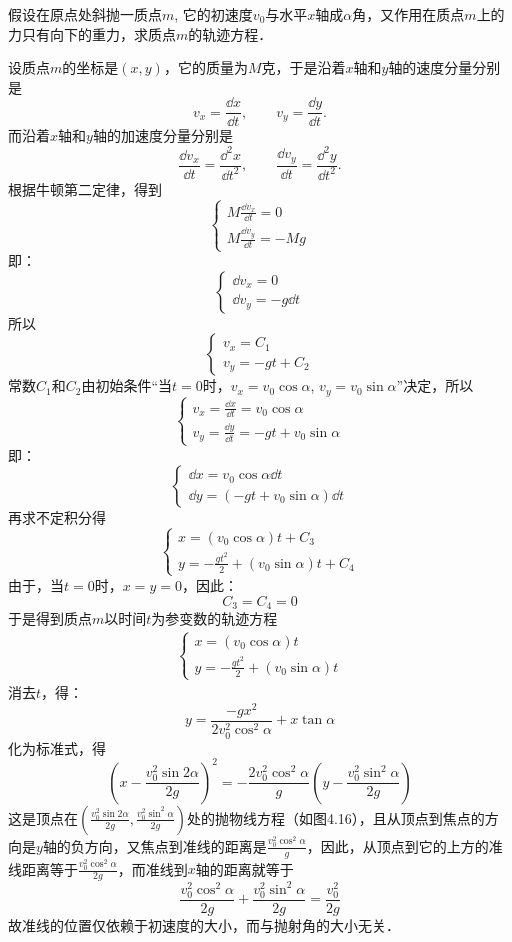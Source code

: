 \begin{example}
假设在原点处斜抛一质点$m$, 它的初速度$v_0$与水平$x$轴成$\alpha$角，又作用在质点$m$上的力只有向下的重力，求质点$m$的轨迹方程．
\end{example}

\begin{solution}
    设质点$m$的坐标是$(x,y)$，它的质量为$M$克，于是沿着$x$轴和$y$轴的速度分量分别是
    \[v_x=\frac{\dd x}{\dd t},\qquad v_y=\frac{\dd y}{\dd t}.\]
    而沿着$x$轴和$y$轴的加速度分量分别是
    \[\frac{\dd v_x}{\dd t}=\frac{\dd^2 x}{\dd t^2},\qquad \frac{\dd v_y}{\dd t}=\frac{\dd^2 y}{\dd t^2}.\]
    根据牛顿第二定律，得到
\[
\begin{cases}
    M\frac{\dd v_x}{\dd t}=0\\
    M\frac{\dd v_y}{\dd t}=-Mg
\end{cases}
\]
即：
\[\begin{cases}
    \dd v_x=0\\ 
    \dd v_y=-g\dd t
\end{cases}\]
所以
\[
\begin{cases}
    v_x=C_1\\ 
    v_y=-gt+C_2
\end{cases}
\] %
常数$C_1$和$C_2$由初始条件“当$t=0$时，$v_x=v_0\cos\alpha$, $v_y=v_0\sin\alpha$”决定，所以
\[ %
\begin{cases}
v_x=\frac{\dd x}{\dd t}=v_0\cos\alpha\\
v_y=\frac{\dd y}{\dd t}=-gt+v_0\sin\alpha
\end{cases}
\] 
即：
\[\begin{cases}
    \dd x=v_0\cos\alpha \dd t\\ \dd y=(-g t+v_0\sin\alpha)\dd t
\end{cases}\]
再求不定积分得
\[\begin{cases}
    x=(v_0\cos\alpha)t+C_3\\
    y=-\frac{gt^2}{2}+(v_0\sin\alpha)t+C_4
\end{cases}\]
由于，当$t=0$时，$x=y=0$，因此：
\[C_3=C_4=0\]
于是得到质点$m$以时间$t$为参变数的轨迹方程
\begin{align}
\begin{cases}
    x=(v_0\cos\alpha)t\\
    y=-\frac{gt^2}{2}+(v_0\sin\alpha)t
\end{cases}
\end{align}
消去$t$，得：
\[y=\frac{-gx^2}{2v^2_0 \cos^2\alpha}+x\tan\alpha\]
化为标准式，得
\[\left(x-\frac{v^2_0\sin2\alpha}{2g}\right)^2=-\frac{2v^2_0\cos^2\alpha}{g}\left(y-\frac{v^2_0\sin^2\alpha}{2g}\right)\]
这是顶点在$\left(\frac{v^2_0\sin2\alpha}{2g},\frac{v^2_0\sin^2\alpha}{2g}\right)$处的抛物线方程（如图4.16），且从顶点到焦点的方向是$y$轴的负方向，又焦点到准线的距离是$\frac{v^2_0 \cos^2\alpha}{g}$，因此，从顶点到它的上方的准线距离等于$\frac{v^2_0 \cos^2\alpha}{2g}$，而准线到$x$轴的距离就等于
\[\frac{v^2_0 \cos^2\alpha}{2g}+\frac{v^2_0 \sin^2\alpha}{2g}=\frac{v^2_0}{2g}\]
故准线的位置仅依赖于初速度的大小，而与抛射角的大小无关．


\end{solution}
